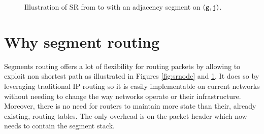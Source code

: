 \begin{figure}[H]
\begin{center}
\end{center}
\caption{Illustration of SR from  to  with an adjacency segment on $(\texttt{g}, \texttt{j})$.}
\label{fig:sradj}
\end{figure}

\section{Why segment routing}

Segments routing offers a lot of flexibility for routing packets by allowing to exploit non shortest path as illustrated
in Figures \ref{fig:srnode} and \ref{fig:sradj}.
It does so by leveraging traditional IP routing so it is easily implementable on current networks without
needing to change the way networks operate or their infrastructure. Moreover, there is no need for routers
to maintain more state than their, already existing, routing tables. The only overhead is on the packet header
which now needs to contain the segment stack.

